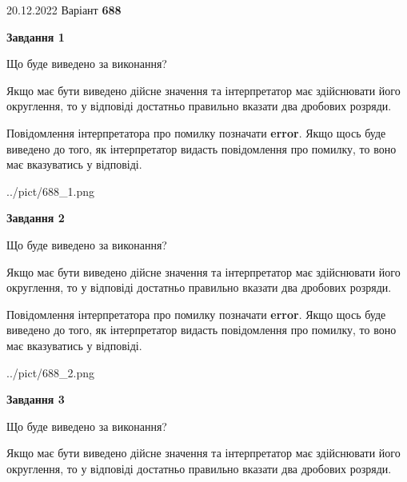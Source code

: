 \documentclass[12pt, ukrainian]{article}
\begin{document}
{20.12.2022 Варіант \No \textbf { 688 }\par}
{
\begin {Large}

{\begin {center}\textbf{Завдання 1}\end {center}}\par
Що буде виведено за виконання? \par

Якщо має бути виведено дійсне значення та інтерпретатор має здійснювати його округлення, 
то у відповіді достатньо правильно вказати два дробових розряди.

Повідомлення інтерпретатора про помилку позначати \textbf{error}.
Якщо щось буде виведено до того, як інтерпретатор видасть повідомлення про помилку, 
то воно має вказуватись у відповіді. \par

\begin{center}
	{../pict/688_1.png}
\end{center}
\newpage

{\begin {center}\textbf{Завдання 2}\end {center}}\par
Що буде виведено за виконання? \par

Якщо має бути виведено дійсне значення та інтерпретатор має здійснювати його округлення, 
то у відповіді достатньо правильно вказати два дробових розряди.

Повідомлення інтерпретатора про помилку позначати \textbf{error}.
Якщо щось буде виведено до того, як інтерпретатор видасть повідомлення про помилку, 
то воно має вказуватись у відповіді. \par

\begin{center}
	{../pict/688_2.png}
\end{center}
\newpage

{\begin {center}\textbf{Завдання 3}\end {center}}\par
Що буде виведено за виконання? \par

Якщо має бути виведено дійсне значення та інтерпретатор має здійснювати його округлення, 
то у відповіді достатньо правильно вказати два дробових розряди.


\end{Large}}
\end{document}
